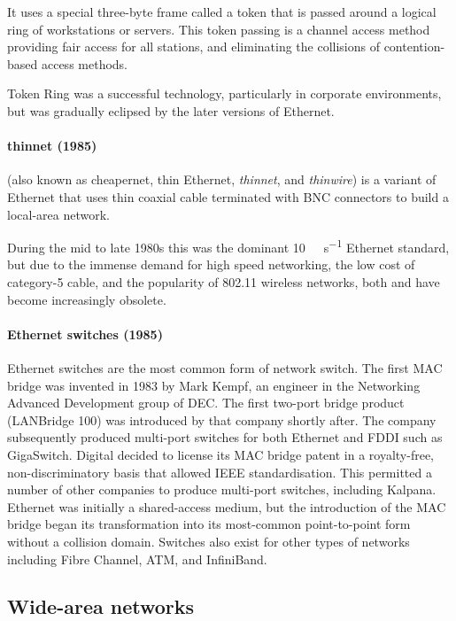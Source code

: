 {It uses a special three-byte frame called a token that is passed around a logical ring of workstations or servers.
This token passing is a channel access method providing fair access for all stations, and eliminating the collisions of contention-based access methods.

Token Ring was a successful technology, particularly in corporate environments, but was gradually eclipsed by the later versions of Ethernet.

\paragraph{thinnet (1985)}
 (also known as cheapernet, thin Ethernet, \emph{thinnet}, and \emph{thinwire}) is a variant of Ethernet that uses thin coaxial cable terminated with \acs{BNC} connectors to build a local-area network.

During the mid to late 1980s this was the dominant \SI{10}{\mega\bit\per\second} Ethernet standard, but due to the immense demand for high speed networking, the low cost of \mbox{category-5} cable, and the popularity of 802.11 wireless networks, both  and  have become increasingly obsolete.

\paragraph{Ethernet switches (1985)}
Ethernet switches are the most common form of network switch.
The first \acs{MAC} bridge was invented in 1983 by Mark Kempf, an engineer in the Networking Advanced Development group of \gls{DEC}.
The first two-port bridge product (LANBridge 100) was introduced by that company shortly after.
The company subsequently produced multi-port switches for both Ethernet and \acs{FDDI} such as GigaSwitch.
Digital decided to license its \acs{MAC} bridge patent in a royalty-free, non-dis\-crim\-i\-na\-tory basis that allowed \acs{IEEE} standardisation.
This permitted a number of other companies to produce multi-port switches, including Kalpana.
Ethernet was initially a shared-access medium, but the introduction of the \acs{MAC} bridge began its transformation into its most-common point-to-point form without a collision domain.
Switches also exist for other types of networks including Fibre Channel, \gls{ATM}, and InfiniBand.
    
\subsection{Wide-area networks}
\label{sec:network-evoluation-wan}

}
